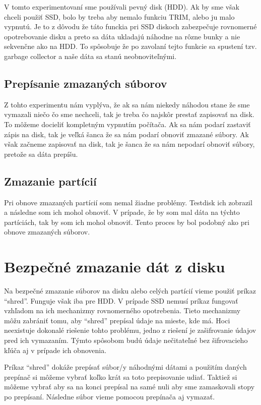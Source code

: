 \documentclass[12pt,oneside,slovak,a4paper]{article}
\begin{document}
V tomto experimentovaní sme používali pevný disk (HDD). Ak by sme však chceli použiť SSD, bolo by treba aby nemalo funkciu TRIM, alebo ju malo vypnutú. Je to z dôvodu že táto funckia pri SSD diskoch zabezpečuje rovnomerné opotrebovanie disku a preto sa dáta ukladajú náhodne na rôzne bunky a nie sekvenčne ako na HDD. To spôsobuje že po zavolaní tejto funkcie sa spustení tzv. garbage collector a naše dáta sa stanú neobnoviteľnými.

\subsection{Prepísanie zmazaných súborov}
Z tohto experimentu nám vyplýva, že ak sa nám niekedy náhodou stane že sme vymazali niečo čo sme nechceli, tak je treba čo najskôr prestať zapisovať na disk. To môžeme docieliť kompletným vypnutím počítača. Ak sa nám podarí zastaviť zápis na disk, tak je veľká šanca že sa nám podarí obnoviť zmazané súbory. Ak však začneme zapisovať na disk, tak je šanca že sa nám nepodarí obnoviť súbory, pretože sa dáta prepíšu.

\subsection{Zmazanie partícií}
Pri obnove zmazaných partícií som nemal žiadne problémy. Testdisk ich zobrazil a následne som ich mohol obnoviť. V prípade, že by som mal dáta na týchto partíciách, tak by som ich mohol obnoviť. Tento proces by bol podobný ako pri obnove zmazaných súborov.

\section{Bezpečné zmazanie dát z disku}
Na bezpečné zmazanie súborov na disku alebo celých partícií vieme použiť príkaz ``shred''. Funguje však iba pre HDD. V prípade SSD nemusí príkaz fungovať vzhľadom na ich mechanizmy rovnomerného opotrebenia. Tieto mechanizmy môžu zabrániť tomu, aby ``shred'' prepísal údaje na mieste, kde má. Hoci neexistuje dokonalé riešenie tohto problému, jedno z riešení je zašifrovanie údajov pred ich vymazaním. Týmto spôsobom budú údaje nečitateľné bez šifrovacieho kľúča aj v prípade ich obnovenia.

Príkaz ``shred'' dokáže prepísať súbor/y náhodnými dátami a použitím daných prepínač si môžeme vybrať koľko krát sa toto prepisovanie udiať. Taktiež si môžeme vybrať aby sa na konci prepísal na samé nuli aby sme zamaskovali stopy po prepísaní. Následne súbor vieme pomocou prepínača aj vymazať.
\end{document}
